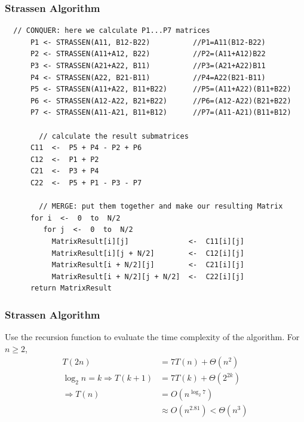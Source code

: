 \documentclass[cjk]{beamer}
\begin{document}
\begin{frame}[fragile]
  \frametitle{Strassen Algorithm}
  \begin{lstlisting}
  // CONQUER: here we calculate P1...P7 matrices
      P1 <- STRASSEN(A11, B12-B22)          //P1=A11(B12-B22)
      P2 <- STRASSEN(A11+A12, B22)          //P2=(A11+A12)B22
      P3 <- STRASSEN(A21+A22, B11)          //P3=(A21+A22)B11
      P4 <- STRASSEN(A22, B21-B11)          //P4=A22(B21-B11)
      P5 <- STRASSEN(A11+A22, B11+B22)      //P5=(A11+A22)(B11+B22)
      P6 <- STRASSEN(A12-A22, B21+B22)      //P6=(A12-A22)(B21+B22)
      P7 <- STRASSEN(A11-A21, B11+B12)      //P7=(A11-A21)(B11+B12)

        // calculate the result submatrices
      C11  <-  P5 + P4 - P2 + P6
      C12  <-  P1 + P2
      C21  <-  P3 + P4
      C22  <-  P5 + P1 - P3 - P7

        // MERGE: put them together and make our resulting Matrix
      for i  <-  0  to  N/2
         for j  <-  0  to  N/2
           MatrixResult[i][j]              <-  C11[i][j]
           MatrixResult[i][j + N/2]        <-  C12[i][j]
           MatrixResult[i + N/2][j]        <-  C21[i][j]
           MatrixResult[i + N/2][j + N/2]  <-  C22[i][j]
      return MatrixResult
\end{lstlisting}
\end{frame}
\begin{frame}
  \frametitle{Strassen Algorithm}

  Use the recursion function to evaluate the time complexity of the algorithm.
  For \(n\geqslant 2\),
  \begin{equation}
    \begin{aligned}
      T(2n)                          & =7T(n)+\Theta(n^{2})              \\
      \log_{2} n=k\Rightarrow T(k+1) & =7T(k)+\Theta(2^{2k})             \\
      \Rightarrow T(n)               & =O(n^{\log_{2}7})                 \\
                                     & \approx O(n^{2.81})<\Theta(n^{3})
    \end{aligned}
  \end{equation}
\end{frame}
\end{document}
